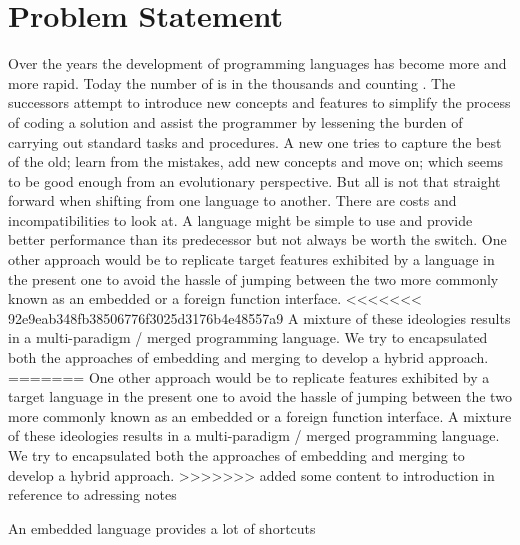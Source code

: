 \documentclass[thesis-solanki.tex]{subfiles}
\begin{document}
\section{Problem Statement}

Over the years the development of programming languages has become more and more rapid.
Today the number of is in the thousands and counting \cite{website:timelineproglangwiki, website:historyofproglang}.
The successors attempt to introduce new concepts and features to simplify the process of coding a solution and assist
the programmer by lessening the burden of carrying out standard tasks and procedures.
A new one tries to capture the best of the old; learn from the mistakes, add new concepts and move on; which seems to be
good enough from an evolutionary perspective.
But all is not that straight forward when shifting from one language to another.
There are costs and incompatibilities to look at.
A language might be simple to use and provide better performance than its predecessor but not always be worth the
switch.
One other approach would be to replicate target features exhibited by a language in the present one to avoid the
hassle of jumping between the two\yyy{}{\Large,} more commonly known as an embedded or a foreign function interface.
<<<<<<< 92e9eab348fb38506776f3025d3176b4e48557a9
A mixture of these ideologies results in a multi-paradigm / merged programming language.
We try to encapsulated both the approaches of embedding and merging to develop a hybrid approach.
=======
One other approach would be to replicate features exhibited by a target language in the present one to avoid the hassle of
jumping between the two more commonly known as an embedded or a foreign function interface. A mixture of these ideologies results in a 
multi-paradigm / merged programming language. We try to encapsulated both the approaches of embedding and merging to develop a hybrid 
approach.
>>>>>>> added some content to introduction in reference to adressing notes

An embedded language provides a lot of shortcuts
\end{document}
